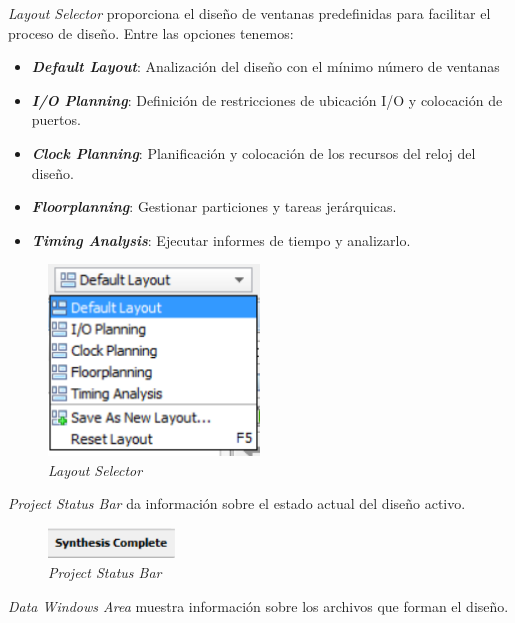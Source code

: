 \textit{Layout Selector} proporciona el diseño de ventanas predefinidas para facilitar el proceso de diseño. Entre las opciones tenemos:
\begin{itemize}
    \item \textit{\textbf{Default Layout}}: Analización del diseño con el mínimo número de ventanas
    \item \textit{\textbf{I/O Planning}}: Definición de restricciones de ubicación I/O y colocación de puertos.
    \item \textit{\textbf{Clock Planning}}: Planificación y colocación de los recursos del reloj del diseño.
    \item \textit{\textbf{Floorplanning}}: Gestionar particiones y tareas jerárquicas.
    \item \textit{\textbf{Timing Analysis}}: Ejecutar informes de tiempo y analizarlo.
\end{itemize} 

\begin{figure}[H]
    \centering
    \includegraphics[width = 0.5\textwidth]{imagenes/Layoutselector.png}
    \caption{\textit{Layout Selector}}\label{Layoutselector}
\end{figure}

\textit{Project Status Bar} da información sobre el estado actual del diseño activo.

\begin{figure}[H]
    \centering
    \includegraphics[width = 0.3\textwidth]{imagenes/psb.png}
    \caption{\textit{Project Status Bar}}\label{psb}
\end{figure}

\textit{Data Windows Area} muestra información sobre los archivos que forman el diseño.

